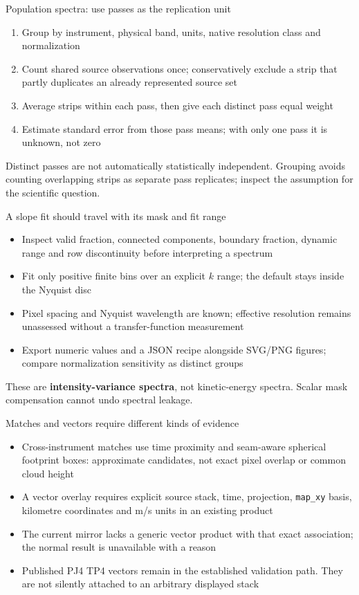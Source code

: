 \documentclass[aspectratio=169,11pt]{beamer}
\newcommand{\currevsec}{}
\newcommand{\revsec}[1]{\gdef\currevsec{#1}}
\begin{document}
\begin{frame}{Population spectra: use passes as the replication unit}
  \revsec{4.19}
\begin{enumerate}
    \item Group by instrument, physical band, units, native resolution class and normalization
    \item Count shared source observations once; conservatively exclude a strip that partly duplicates an already represented source set
    \item Average strips within each pass, then give each distinct pass equal weight
    \item Estimate standard error from those pass means; with only one pass it is unknown, not zero
  \end{enumerate}
  \vspace{0.2cm}
  Distinct passes are not automatically statistically independent. Grouping avoids counting overlapping strips as separate pass replicates; inspect the assumption for the scientific question.
\end{frame}

\begin{frame}{A slope fit should travel with its mask and fit range}
  \revsec{4.19}
\begin{itemize}
    \item Inspect valid fraction, connected components, boundary fraction, dynamic range and row discontinuity before interpreting a spectrum
    \item Fit only positive finite bins over an explicit $k$ range; the default stays inside the Nyquist disc
    \item Pixel spacing and Nyquist wavelength are known; effective resolution remains unassessed without a transfer-function measurement
    \item Export numeric values and a JSON recipe alongside SVG/PNG figures; compare normalization sensitivity as distinct groups
  \end{itemize}
  These are \textbf{intensity-variance spectra}, not kinetic-energy spectra. Scalar mask compensation cannot undo spectral leakage.
\end{frame}

\begin{frame}{Matches and vectors require different kinds of evidence}
  \revsec{4.19}
\begin{itemize}
    \item Cross-instrument matches use time proximity and seam-aware spherical footprint boxes: approximate candidates, not exact pixel overlap or common cloud height
    \item A vector overlay requires explicit source stack, time, projection, \texttt{map\_xy} basis, kilometre coordinates and m/s units in an existing product
    \item The current mirror lacks a generic vector product with that exact association; the normal result is unavailable with a reason
    \item Published PJ4 TP4 vectors remain in the established validation path. They are not silently attached to an arbitrary displayed stack
  \end{itemize}
\end{frame}
\end{document}
